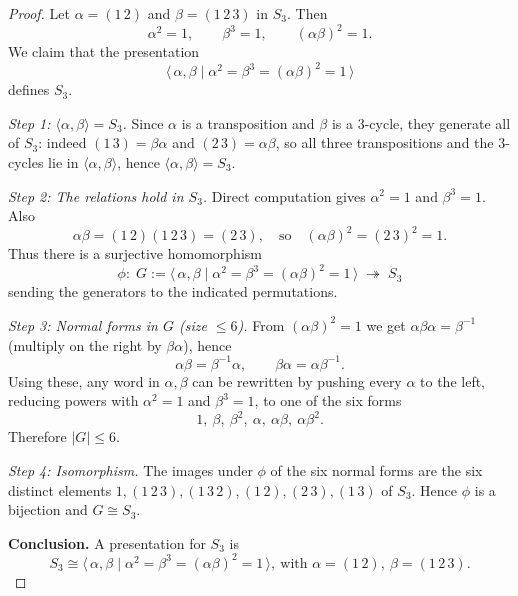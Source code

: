 \documentclass[12pt]{article}
\theoremstyle{definition}
\begin{document}
\dotfill

\begin{proof}
Let $\alpha=(1\,2)$ and $\beta=(1\,2\,3)$ in $S_3$. Then
\[
\alpha^2=1,\qquad \beta^3=1,\qquad (\alpha\beta)^2=1.
\]
We claim that the presentation
\[
\langle\,\alpha,\beta\mid \alpha^2=\beta^3=(\alpha\beta)^2=1\,\rangle
\]
defines $S_3$.

\smallskip

\noindent\emph{Step 1: $\langle\alpha,\beta\rangle=S_3$.}
Since $\alpha$ is a transposition and $\beta$ is a $3$-cycle, they generate all of $S_3$:
indeed $(1\,3)=\beta\alpha$ and $(2\,3)=\alpha\beta$, so all three transpositions and the $3$-cycles lie in
$\langle\alpha,\beta\rangle$, hence $\langle\alpha,\beta\rangle=S_3$.

\smallskip

\noindent\emph{Step 2: The relations hold in $S_3$.}
Direct computation gives $\alpha^2=1$ and $\beta^3=1$. Also
\[
\alpha\beta=(1\,2)(1\,2\,3)=(2\,3),\quad\text{so}\quad (\alpha\beta)^2=(2\,3)^2=1.
\]
Thus there is a surjective homomorphism
\[
\phi:\; G:=\langle\,\alpha,\beta\mid \alpha^2=\beta^3=(\alpha\beta)^2=1\,\rangle\;\twoheadrightarrow\; S_3
\]
sending the generators to the indicated permutations.

\smallskip

\noindent\emph{Step 3: Normal forms in $G$ (size $\le 6$).}
From $(\alpha\beta)^2=1$ we get $\alpha\beta\alpha=\beta^{-1}$ (multiply on the right by $\beta\alpha$),
hence
\[
\alpha\beta=\beta^{-1}\alpha,\qquad \beta\alpha=\alpha\beta^{-1}.
\]
Using these, any word in $\alpha,\beta$ can be rewritten by pushing every $\alpha$ to the left, reducing
powers with $\alpha^2=1$ and $\beta^3=1$, to one of the six forms
\[
1,\ \beta,\ \beta^2,\ \alpha,\ \alpha\beta,\ \alpha\beta^2.
\]
Therefore $|G|\le 6$.

\smallskip

\noindent\emph{Step 4: Isomorphism.}
The images under $\phi$ of the six normal forms are the six distinct elements
$1,(1\,2\,3),(1\,3\,2),(1\,2),(2\,3),(1\,3)$ of $S_3$. Hence $\phi$ is a bijection and $G\cong S_3$.

\smallskip

\noindent\textbf{Conclusion.}
A presentation for $S_3$ is
\[
\boxed{\,S_3 \cong \langle\,\alpha,\beta\mid \alpha^2=\beta^3=(\alpha\beta)^2=1\,\rangle,\ \text{with }\alpha=(1\,2),\ \beta=(1\,2\,3).\,}
\]
\end{proof}

\newpage
\end{document}
